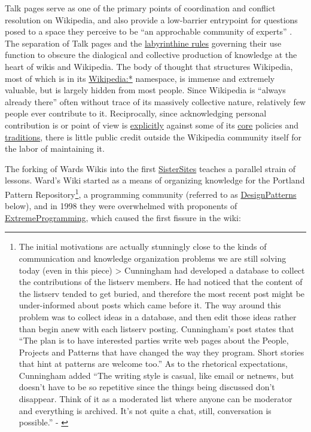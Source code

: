 \documentclass[notoc]{tufte-book}
\begin{document}
Talk pages serve as one of the primary points of coordination and
conflict resolution on Wikipedia, and also provide a low-barrier
entrypoint for questions posed to a space they perceive to be ``an
approchable community of experts'' \citep{viegasTalkYouType2007} .
The separation of Talk pages and the
\href{https://en.wikipedia.org/wiki/Wikipedia:Talk_page_guidelines}{labyrinthine
rules} governing their use function to obscure the dialogical and
collective production of knowledge at the heart of wikis and Wikipedia.
The body of thought that structures Wikipedia, most of which is in its
\href{https://en.wikipedia.org/wiki/Wikipedia:Community_portal}{Wikipedia:*}
namespace, is immense and extremely valuable, but is largely hidden from
most people. Since Wikipedia is ``always already there'' often without
trace of its massively collective nature, relatively few people ever
contribute to it. Reciprocally, since acknowledging personal
contribution is or point of view is
\href{https://en.wikipedia.org/wiki/Wikipedia:No_original_research}{explicitly}
against some of its
\href{https://en.wikipedia.org/wiki/Wikipedia:Neutral_point_of_view}{core}
policies and
\href{https://en.wikipedia.org/wiki/Wikipedia:Avoid_thread_mode}{traditions},
there is little public credit outside the Wikipedia community itself for
the labor of maintaining it.

The forking of Wards Wikis into the first
\href{http://wiki.c2.com/?SisterSites}{SisterSites} teaches a parallel
strain of lessons. Ward's Wiki started as a means of organizing
knowledge for the Portland Pattern Repository\footnote{The initial
  motivations are actually stunningly close to the kinds of
  communication and knowledge organization problems we are still solving
  today (even in this piece) \textgreater{} Cunningham had developed a
  database to collect the contributions of the listserv members. He had
  noticed that the content of the listserv tended to get buried, and
  therefore the most recent post might be under-informed about posts
  which came before it. The way around this problem was to collect ideas
  in a database, and then edit those ideas rather than begin anew with
  each listserv posting. Cunningham's post states that ``The plan is to
  have interested parties write web pages about the People, Projects and
  Patterns that have changed the way they program. Short stories that
  hint at patterns are welcome too.'' As to the rhetorical expectations,
  Cunningham added ``The writing style is casual, like email or netnews,
  but doesn't have to be so repetitive since the things being discussed
  don't disappear. Think of it as a moderated list where anyone can be
  moderator and everything is archived. It's not quite a chat, still,
  conversation is possible.'' - \citep{cummingsWhatWasWikiWhy2009} }, a programming community (referred to as
\href{http://wiki.c2.com/?DesignPatterns}{DesignPatterns} below), and in
1998 they were overwhelmed with proponents of
\href{http://wiki.c2.com/?ExtremeProgramming}{ExtremeProgramming}, which
caused the first fissure in the wiki:
\end{document}
